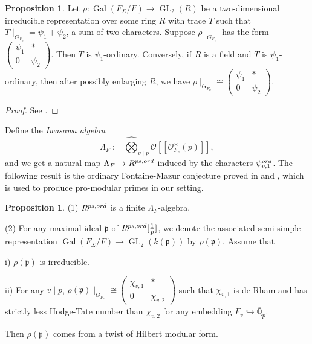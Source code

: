 \documentclass[12pt]{amsart}
\theoremstyle{plain}
\theoremstyle{definition}
\newtheorem{prop}[thm]{Proposition}
\theoremstyle{remark}
\begin{document}
\begin{prop}\label{psi1}
	Let $\rho : \operatorname{Gal}(F_\Sigma/F) \to  \operatorname{GL}_2(R)$ be a two-dimensional irreducible representation over some ring $R$ with trace $T$ such that $T \mid_{G_{F_v}} = \psi_1 + \psi_2$, a sum of two characters. Suppose $\rho\mid_{G_{F_v}}$ has the form $\begin{pmatrix}
		\psi_{1} & *\\
		0 & \psi_{2}
	\end{pmatrix}$. Then $T$ is $\psi_1$-ordinary. Conversely, if $R$ is a field and $T$ is $\psi_1$-ordinary, then after possibly enlarging $R$,
	we have $\rho\mid_{G_{F_v}} \cong \begin{pmatrix}
		\psi_{1} & *\\
		0 & \psi_{2}
	\end{pmatrix}$.
\end{prop}

\begin{proof}
	See \cite[Lemma 5.3.2]{pan2022fontaine}.
\end{proof}

  Define the \textit{Iwasawa algebra} $$
\Lambda_F := \widehat{\bigotimes}_{v \mid p} \mathcal{O}[[\mathcal{O}_{F_v}^\times(p)]], $$
and we get a natural map $\Lambda_F \to R^{\textnormal{ps,ord}} $ induced by the characters $ \psi_{v,1}^{\textnormal{ord}}$. The following result is the ordinary Fontaine-Mazur conjecture proved in \cite{skinner1999residually} and \cite[Section 5]{pan2022fontaine}, which is used to produce pro-modular primes in our setting.

\begin{prop}\label{ordinary}
	(1) $ R^{\textnormal{ps,ord}}$ is a finite $ \Lambda_F$-algebra. 
	
	(2) For any maximal ideal $\mathfrak{p}$ of $R^{\textnormal{ps,ord}}[\frac{1}{p}]$, we denote the associated semi-simple representation $\operatorname{Gal}(F_{\Sigma}/F) \to \operatorname{GL}_2(k(\mathfrak{p}))$ by $\rho(\mathfrak{p})$. Assume that
	
	\quad i) $ \rho(\mathfrak{p})$ is irreducible.
	
	\quad ii) For any $v \mid p$, $\rho(\mathfrak{p}) \mid_{G_{F_v}} \cong  \begin{pmatrix}
		\chi_{v,1} & *\\
		0 & \chi_{v,2}
	\end{pmatrix}$ such that $\chi_{v,1} $ is de Rham and has strictly less Hodge-Tate number than $\chi_{v,2} $ for any embedding $F_v \hookrightarrow \overline{\mathbb{Q}}_p$.
	
	Then $ \rho(\mathfrak{p})$ comes from a twist of Hilbert modular form.
\end{prop}
\end{document}
